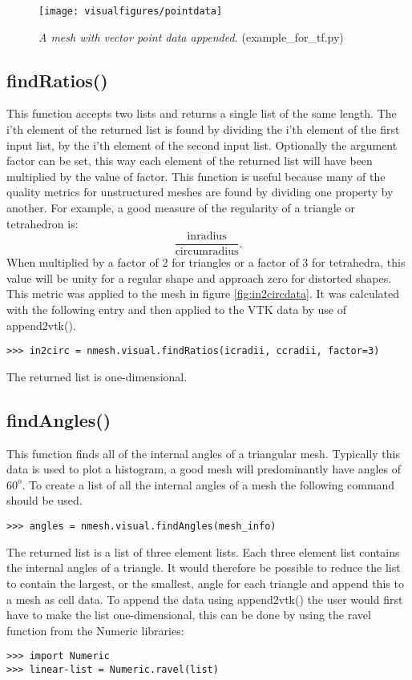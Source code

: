 \begin{figure}
\begin{center}
\texttt{[image: visualfigures/pointdata]}
\caption{{\em A mesh with vector point data appended. }(example\_for\_tf.py) \label{fig:pointdata}}
\end{center}
\end{figure}



\subsection{{\ttfamily findRatios()}}
This function accepts two lists and returns a single list of the same length. The i'th element of the returned list is found by dividing the i'th element of the first input list, by the i'th element of the second input list. Optionally the argument {\ttfamily factor} can be set, this way each element of the returned list will have been multiplied by the value of {\ttfamily factor}. This function is useful because many of the quality metrics for unstructured meshes are found by dividing one property by another. For example, a good measure of the regularity of a triangle or tetrahedron is:
\[
\frac{\mathrm{inradius}}{\mathrm{circumradius}}.
\]
When multiplied by a factor of 2 for triangles or a factor of 3 for tetrahedra, this value will be unity for a regular shape and approach zero for distorted shapes. This metric was applied to the mesh in figure \ref{fig:in2circdata}. It was calculated with the following entry and then applied to the VTK data by use of {\ttfamily append2vtk()}.
\begin{lstlisting}[basicstyle=\small\ttfamily]
>>> in2circ = nmesh.visual.findRatios(icradii, ccradii, factor=3)
\end{lstlisting}
The returned list is one-dimensional.


\subsection{{\ttfamily findAngles()}}
This function finds all of the internal angles of a triangular mesh. Typically this data is used to plot a histogram, a good mesh will predominantly have angles of $60^{o}$. To create a list of all the internal angles of a mesh the following command should be used.
\begin{lstlisting}[basicstyle=\small\ttfamily]
>>> angles = nmesh.visual.findAngles(mesh_info)
\end{lstlisting}
The returned list is a list of three element lists. Each three element list contains the internal angles of a triangle. It would therefore be possible to reduce the list to contain the largest, or the smallest, angle for each triangle and append this to a mesh as cell data. To append the data using {\ttfamily append2vtk()} the user would first have to make the list one-dimensional, this can be done by using the {\ttfamily ravel} function from the {\ttfamily Numeric} libraries:
\begin{lstlisting}[basicstyle=\small\ttfamily]
>>> import Numeric
>>> linear-list = Numeric.ravel(list)
\end{lstlisting}




